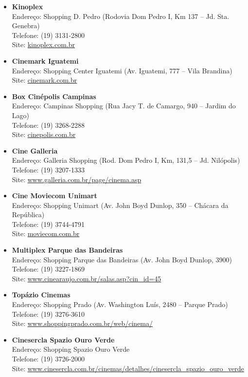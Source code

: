 \begin{itemize}
    \item   \textbf{Kinoplex}
        \\Endereço: Shopping D. Pedro (Rodovia Dom Pedro I, Km 137 -- Jd. Sta. Genebra)
        \\Telefone: (19) 3131-2800
        \\Site: \url{kinoplex.com.br}

    \item   \textbf{Cinemark Iguatemi}
        \\Endereço: Shopping Center Iguatemi (Av. Iguatemi, 777 -- Vila Brandina)
        \\Site: \url{cinemark.com.br}

    \item   \textbf{Box Cinépolis Campinas}
        \\Endereço: Campinas Shopping (Rua Jacy T. de Camargo, 940 -- Jardim do Lago)
        \\Telefone: (19) 3268-2288
        \\Site: \url{cinepolis.com.br}

    \item   \textbf{Cine Galleria}
        \\Endereço: Galleria Shopping (Rod. Dom Pedro I, Km, 131,5 -- Jd. Nilópolis)
        \\Telefone: (19) 3207-1333
        \\Site: \url{www.galleria.com.br/page/cinema.asp}

    \item   \textbf{Cine Moviecom Unimart}
        \\Endereço: Shopping Unimart (Av. John Boyd Dunlop, 350 -- Chácara da República)
        \\Telefone: (19) 3744-4791
        \\Site: \url{moviecom.com.br}

    \item   \textbf{Multiplex Parque das Bandeiras}
        \\Endereço: Shopping Parque das Bandeiras (Av. John Boyd Dunlop, 3900)
        \\Telefone: (19) 3227-1869
        \\Site: \url{www.cinearaujo.com.br/salas.asp?cin_id=45}
		
    \item   \textbf{Topázio Cinemas}
        \\Endereço: Shopping Prado (Av. Washington Luís, 2480 -- Parque Prado)
        \\Telefone: (19) 3276-3610
        \\Site: \url{www.shoppingprado.com.br/web/cinema/}

    \item   \textbf{Cinesercla Spazio Ouro Verde}
        \\Endereço: Shopping Spazio Ouro Verde
        \\Telefone: (19) 3726-2000
        \\Site: \url{www.cinesercla.com.br/cinemas/detalhes/cinesercla_spazio_ouro_verde}

\end{itemize}

